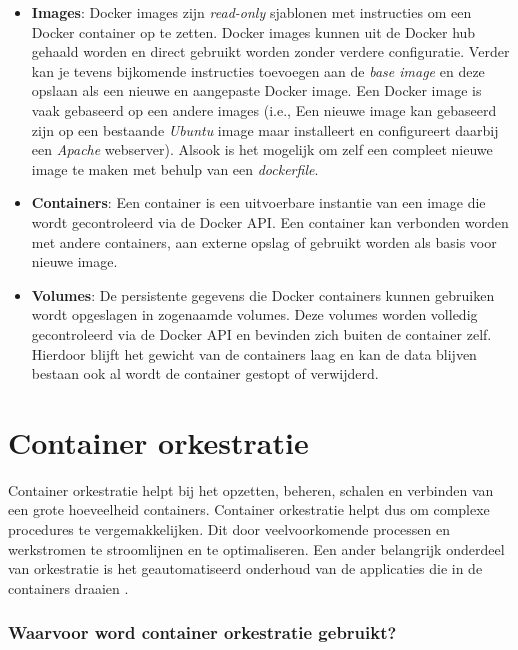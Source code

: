 \begin{itemize}
        \item \textbf{Images}: Docker images zijn \textit{read-only} sjablonen met instructies om een Docker container op te zetten. Docker images kunnen uit de Docker hub gehaald worden en direct gebruikt worden zonder verdere configuratie. Verder kan je tevens bijkomende instructies toevoegen aan de \textit{base image} en deze opslaan als een nieuwe en aangepaste Docker image. Een Docker image is vaak gebaseerd op een andere images (i.e., Een nieuwe image kan gebaseerd zijn op een bestaande \textit{Ubuntu} image maar installeert en configureert daarbij een \textit{Apache} webserver). Alsook is het mogelijk om zelf een compleet nieuwe image te maken met behulp van een \textit{dockerfile}.
        \item \textbf{Containers}: Een container is een uitvoerbare instantie van een image die wordt gecontroleerd via de Docker API. Een container kan verbonden worden met andere containers, aan externe opslag of gebruikt worden als basis voor nieuwe image.
        \item \textbf{Volumes}: De persistente gegevens die Docker containers kunnen gebruiken wordt opgeslagen in zogenaamde volumes. Deze volumes worden volledig gecontroleerd via de Docker API en bevinden zich buiten de container zelf. Hierdoor blijft het gewicht van de containers laag en kan de data blijven bestaan ook al wordt de container gestopt of verwijderd.
\end{itemize}

\section{Container orkestratie}
Container orkestratie helpt bij het opzetten, beheren, schalen en verbinden van een grote hoeveelheid containers. Container orkestratie helpt dus om complexe procedures te vergemakkelijken. Dit door veelvoorkomende processen en werkstromen te stroomlijnen en te optimaliseren. Een ander belangrijk onderdeel van orkestratie is het geautomatiseerd onderhoud van de applicaties die in de containers draaien \autocite{RedHat2021}.

\subsubsection{Waarvoor word container orkestratie gebruikt?}


